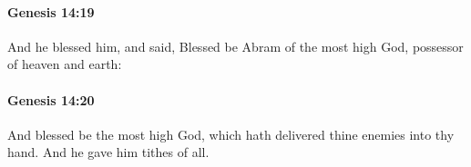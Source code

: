 		\paragraph{Genesis 14:19} %
			\label{GENESIS-14-19}

			And he blessed him, and said, Blessed be Abram of the most high God, possessor of heaven and earth:


		\paragraph{Genesis 14:20} %
			\label{GENESIS-14-20}

			And blessed be the most high God, which hath delivered thine enemies into thy hand. And he gave him tithes of all.


